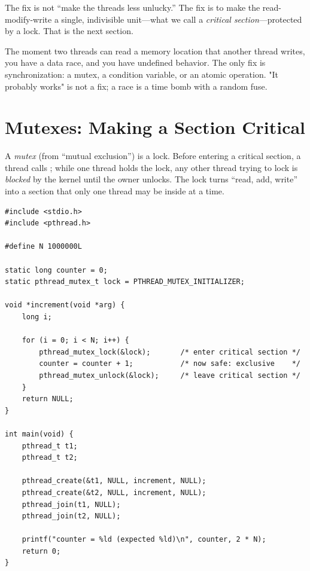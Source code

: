 The fix is not ``make the threads less unlucky.'' The fix is to make
the read-modify-write a single, indivisible unit---what we call a
\emph{critical section}---protected by a lock. That is the next
section.

\begin{ruleofthumb}
The moment two threads can read a memory location that another thread
writes, you have a data race, and you have undefined behavior. The
only fix is synchronization: a mutex, a condition variable, or an
atomic operation. "It probably works" is not a fix; a race is a time
bomb with a random fuse.
\end{ruleofthumb}

\section{Mutexes: Making a Section Critical}

A \emph{mutex} (from ``mutual exclusion'') is a lock. Before entering
a critical section, a thread calls ; while
one thread holds the lock, any other thread trying to lock is
\emph{blocked} by the kernel until the owner unlocks. The lock turns
``read, add, write'' into a section that only one thread may be inside
at a time.

\begin{lstlisting}[caption={The race, fixed with a mutex.}]
#include <stdio.h>
#include <pthread.h>

#define N 1000000L

static long counter = 0;
static pthread_mutex_t lock = PTHREAD_MUTEX_INITIALIZER;

void *increment(void *arg) {
    long i;

    for (i = 0; i < N; i++) {
        pthread_mutex_lock(&lock);       /* enter critical section */
        counter = counter + 1;           /* now safe: exclusive    */
        pthread_mutex_unlock(&lock);     /* leave critical section */
    }
    return NULL;
}

int main(void) {
    pthread_t t1;
    pthread_t t2;

    pthread_create(&t1, NULL, increment, NULL);
    pthread_create(&t2, NULL, increment, NULL);
    pthread_join(t1, NULL);
    pthread_join(t2, NULL);

    printf("counter = %ld (expected %ld)\n", counter, 2 * N);
    return 0;
}
\end{lstlisting}

